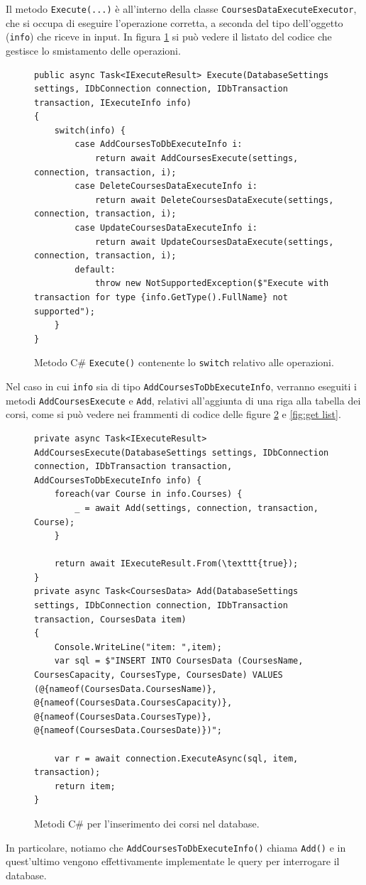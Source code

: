 Il metodo \texttt{Execute(...)} è all'interno della classe \texttt{CoursesDataExecuteExecutor}, che si occupa di eseguire l'operazione corretta, a seconda del tipo dell'oggetto (\texttt{info}) che riceve in input. In figura \ref{fig:switch} si può vedere il listato del codice che gestisce lo smistamento delle operazioni.
\begin{figure}[H]
\begin{lstlisting}
public async Task<IExecuteResult> Execute(DatabaseSettings settings, IDbConnection connection, IDbTransaction transaction, IExecuteInfo info)
{
    switch(info) {
        case AddCoursesToDbExecuteInfo i: 
            return await AddCoursesExecute(settings, connection, transaction, i);
        case DeleteCoursesDataExecuteInfo i:
            return await DeleteCoursesDataExecute(settings, connection, transaction, i);
        case UpdateCoursesDataExecuteInfo i:
            return await UpdateCoursesDataExecute(settings, connection, transaction, i);
        default:
            throw new NotSupportedException($"Execute with transaction for type {info.GetType().FullName} not supported");
    }
}
\end{lstlisting}
\caption{\label{fig:switch}Metodo C\# \texttt{Execute()} contenente lo \texttt{switch} relativo alle operazioni.}
\end{figure}

Nel caso in cui \texttt{info} sia di tipo \texttt{AddCoursesToDbExecuteInfo}, verranno eseguiti i metodi \texttt{AddCoursesExecute} e \texttt{Add}, relativi all'aggiunta di una riga alla tabella dei corsi, come si può vedere nei frammenti di codice delle figure \ref{fig:adding} e \ref{fig:get list}.

\begin{figure}[H]
\begin{lstlisting}
private async Task<IExecuteResult> AddCoursesExecute(DatabaseSettings settings, IDbConnection connection, IDbTransaction transaction, AddCoursesToDbExecuteInfo info) {
    foreach(var Course in info.Courses) {
        _ = await Add(settings, connection, transaction, Course);
    }

    return await IExecuteResult.From(\texttt{true});
}
private async Task<CoursesData> Add(DatabaseSettings settings, IDbConnection connection, IDbTransaction transaction, CoursesData item)
{
    Console.WriteLine("item: ",item);
    var sql = $"INSERT INTO CoursesData (CoursesName, CoursesCapacity, CoursesType, CoursesDate) VALUES (@{nameof(CoursesData.CoursesName)}, @{nameof(CoursesData.CoursesCapacity)}, @{nameof(CoursesData.CoursesType)}, @{nameof(CoursesData.CoursesDate)})";

    var r = await connection.ExecuteAsync(sql, item, transaction);
    return item;
}
\end{lstlisting}
\caption{\label{fig:adding}Metodi C\# per l'inserimento dei corsi nel database.}
\end{figure}
In particolare, notiamo che \texttt{AddCoursesToDbExecuteInfo()} chiama \texttt{Add()} e in quest'ultimo vengono effettivamente implementate le query per interrogare il database.


